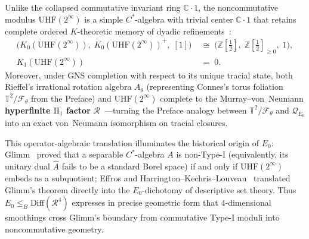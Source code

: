 \documentclass[10pt,twoside,openright]{book}
\theoremstyle{crmplain}
\theoremstyle{crmdef}
\theoremstyle{crmremark}
\begin{document}
Unlike the collapsed commutative invariant ring $\mathbb{C}\cdot 1$, the noncommutative modulus $\mathrm{UHF}(2^\infty)$ is a simple $C^*$-algebra with trivial center $\mathbb{C}\cdot 1$ that retains complete ordered $K$-theoretic memory of dyadic refinements~\cite[Ch.~II]{Connes94}:
\[
  \begin{aligned}
    \bigl(K_0(\mathrm{UHF}(2^\infty)),\; K_0(\mathrm{UHF}(2^\infty))^+,\; [1]\bigr) &\;\cong\; \bigl(\mathbb{Z}[\tfrac{1}{2}],\; \mathbb{Z}[\tfrac{1}{2}]_{\ge 0},\; 1\bigr), \\
    K_1(\mathrm{UHF}(2^\infty)) &\;=\; 0.
  \end{aligned}
\]
Moreover, under GNS completion with respect to its unique tracial state, both Rieffel's irrational rotation algebra $A_\theta$ (representing Connes's torus foliation $\mathbb{T}^2/\mathcal{F}_\theta$ from the Preface) and $\mathrm{UHF}(2^\infty)$ complete to the Murray--von~Neumann \textbf{hyperfinite $\mathrm{II}_1$ factor} $\mathcal{R}$~\cite[Ch.~V]{Connes94}---turning the Preface analogy between $\mathbb{T}^2/\mathcal{F}_\theta$ and $\mathcal{Q}_{E_0}$ into an exact von~Neumann isomorphism on tracial closures.

This operator-algebraic translation illuminates the historical origin of $E_0$: Glimm~\cite[Theorem~1, \S 9]{Glimm61} proved that a separable $C^*$-algebra $A$ is non-Type-I (equivalently, its unitary dual $\widehat{A}$ fails to be a standard Borel space) if and only if $\mathrm{UHF}(2^\infty)$ embeds as a subquotient; Effros and Harrington--Kechris--Louveau~\cite[Theorem~1.1]{HKL90} translated Glimm's theorem directly into the $E_0$-dichotomy of descriptive set theory. Thus $E_0 \le_B \mathrm{Diff}(\mathcal{R}^4)$ expresses in precise geometric form that $4$-dimensional smoothings cross Glimm's boundary from commutative Type-I moduli into noncommutative geometry.
\end{document}
